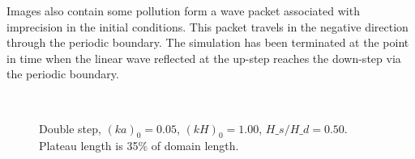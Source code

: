 Images also contain some pollution form a wave packet associated with imprecision in the initial conditions. This packet travels in the negative direction through the periodic boundary.
The simulation has been terminated at the point in time when the linear wave reflected at the up-step reaches the down-step via the periodic boundary. 


\begin{figure}[H]%
\centering
{}\\
%
\caption{Double step, $(ka)_0 = 0.05$, $(kH)_0 = 1.00$, $H\_s/H\_d = 0.50$. Plateau length is 35\% of domain length.}%
\label{fig:res:double}%
\end{figure}






%
